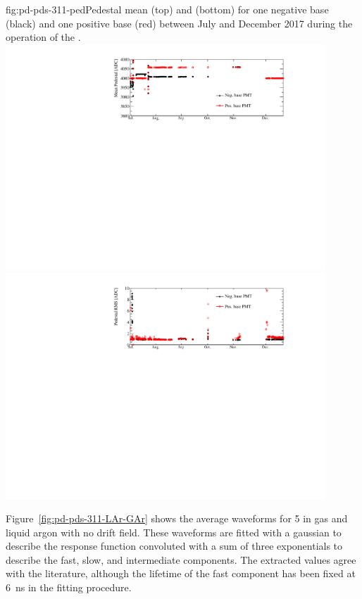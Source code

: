 \begin{dunefigure}{fig:pd-pds-311-ped}{Pedestal mean (top) and  (bottom) for one negative base  (black) and one positive base  (red) between July and December 2017 during the operation of the .}
\includegraphics[width=0.9\textwidth]{graphics/dppd_311_pedestal.pdf}\\
\includegraphics[width=0.9\textwidth]{graphics/dppd_311_pedestal_rms.pdf}
\end{dunefigure}

Figure~\ref{fig:pd-pds-311-LAr-GAr} shows the average waveforms for  5 in gas and liquid argon with no drift field. These waveforms are fitted with a gaussian to describe the response function convoluted with a sum of three exponentials to describe the fast, slow, and intermediate components. 
The extracted values agree with the literature, although the lifetime of the fast component has been fixed at \SI{6}{ns} in the fitting procedure.

